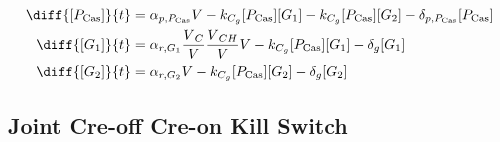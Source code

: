 \begin{align}
\diff{\conc{\proSp{\cas{}}}}{t} & =  \txtlRate{\proSp{\cas{}}}\vectorGen{} - \gRnaBind{}\conc{\proSp{\cas{}}}\conc{\gRna{1}} - \gRnaBind{}\conc{\proSp{\cas{}}}\conc{\gRna{2}} - \proDegradeRate{\proSp{\cas{}}}\conc{\proSp{\cas{}}}\\
\diff{\conc{\gRna{1}}}{t} & =  \txRate{\gRna{1}}\frac{\vectorGen{}_C}{\vectorGen{}}\frac{\vectorGen{}_{CH}}{\vectorGen{}}\vectorGen{} - \gRnaBind{}\conc{\proSp{\cas{}}}\conc{\gRna{1}} - \rnaDegradeRate{}\conc{\gRna{1}}\\
\diff{\conc{\gRna{2}}}{t} & =  \txRate{\gRna{2}}\vectorGen{} - \gRnaBind{}\conc{\proSp{\cas{}}}\conc{\gRna{2}} - \rnaDegradeRate{}\conc{\gRna{2}}
\end{align}

\subsection{Joint Cre-off Cre-on Kill Switch}
\label{s:Joint_Cre_off_Cre_on_Kill_Switch}


